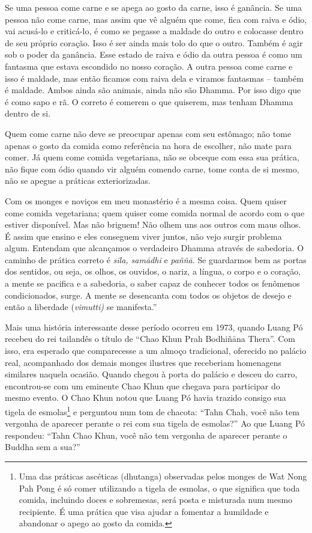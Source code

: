 Se uma pessoa come carne e se apega ao gosto da carne, isso é ganância.
Se uma pessoa não come carne, mas assim que vê alguém que come, fica com
raiva e ódio, vai acusá-lo e criticá-lo, é como se pegasse a maldade do
outro e colocasse dentro de seu próprio coração. Isso é ser ainda mais
tolo do que o outro. Também é agir sob o poder da ganância. Esse estado
de raiva e ódio da outra pessoa é como um fantasma que estava escondido
no nosso coração. A outra pessoa come carne e isso é maldade, mas então
ficamos com raiva dela e viramos fantasmas -- também é maldade. Ambos
ainda são animais, ainda não são Dhamma. Por isso digo que é como sapo e
rã. O correto é comerem o que quiserem, mas tenham Dhamma dentro de si.

Quem come carne não deve se preocupar apenas com seu estômago; não tome
apenas o gosto da comida como referência na hora de escolher, não mate
para comer. Já quem come comida vegetariana, não se obceque com essa sua
prática, não fique com ódio quando vir alguém comendo carne, tome conta
de si mesmo, não se apegue a práticas exteriorizadas.

Com os monges e noviços em meu monastério é a mesma coisa. Quem quiser
come comida vegetariana; quem quiser come comida normal de acordo com o
que estiver disponível. Mas não briguem! Não olhem uns aos outros com
maus olhos. É assim que ensino e eles conseguem viver juntos, não vejo
surgir problema algum. Entendam que alcançamos o verdadeiro Dhamma
através de sabedoria. O caminho de prática correto é \emph{sīla,
samādhi} e \emph{paññā}. Se guardarmos bem as portas dos sentidos, ou
seja, os olhos, os ouvidos, o nariz, a língua, o corpo e o coração, a
mente se pacifica e a sabedoria, o saber capaz de conhecer todos os
fenômenos condicionados, surge. A mente se desencanta com todos os
objetos de desejo e então a liberdade (\emph{vimutti)} se manifesta.''

Mais uma história interessante desse período ocorreu em 1973, quando
Luang Pó recebeu do rei tailandês o título de ``Chao Khun Prah Bodhiñāna
Thera''. Com isso, era esperado que comparecesse a um almoço
tradicional, oferecido no palácio real, acompanhado dos demais monges
ilustres que receberiam homenagens similares naquela ocasião. Quando
chegou à porta do palácio e desceu do carro, encontrou-se com um
eminente Chao Khun que chegava para participar do mesmo evento. O Chao
Khun notou que Luang Pó havia trazido consigo sua tigela de
esmolas\footnote{Uma das práticas ascéticas (dhutanga) observadas pelos
  monges de Wat Nong Pah Pong é só comer utilizando a tigela de esmolas,
  o que significa que toda comida, incluindo doces e sobremesas, será
  posta e misturada num mesmo recipiente. É uma prática que visa ajudar
  a fomentar a humildade e abandonar o apego ao gosto da comida.} e
perguntou num tom de chacota: ``Tahn Chah, você não tem vergonha de
aparecer perante o rei com sua tigela de esmolas?'' Ao que Luang Pó
respondeu: ``Tahn Chao Khun, você não tem vergonha de aparecer perante o
Buddha sem a sua?''
